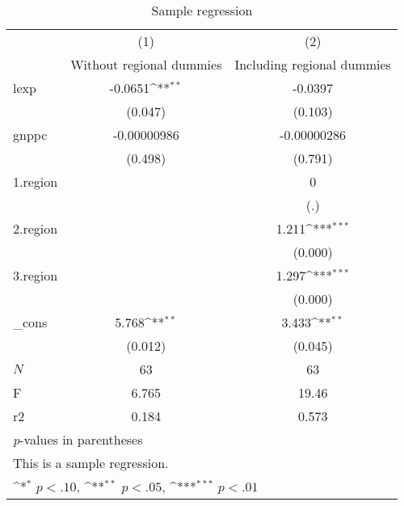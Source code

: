 \begin{table}[htbp]\centering
\def\sym#1{\ifmmode^{#1}\else\(^{#1}\)\fi}
\caption{Sample regression}
\begin{tabular}{l*{2}{c}}
\hline\hline
            &\multicolumn{1}{c}{(1)}&\multicolumn{1}{c}{(2)}\\
            &\multicolumn{1}{c}{Without regional dummies}&\multicolumn{1}{c}{Including regional dummies}\\
\hline
lexp        &     -0.0651\sym{**} &     -0.0397         \\
            &     (0.047)         &     (0.103)         \\
[1em]
gnppc       & -0.00000986         & -0.00000286         \\
            &     (0.498)         &     (0.791)         \\
[1em]
1.region    &                     &           0         \\
            &                     &         (.)         \\
[1em]
2.region    &                     &       1.211\sym{***}\\
            &                     &     (0.000)         \\
[1em]
3.region    &                     &       1.297\sym{***}\\
            &                     &     (0.000)         \\
[1em]
\_cons      &       5.768\sym{**} &       3.433\sym{**} \\
            &     (0.012)         &     (0.045)         \\
\hline
\(N\)       &          63         &          63         \\
F           &       6.765         &       19.46         \\
r2          &       0.184         &       0.573         \\
\hline\hline
\multicolumn{3}{l}{\footnotesize \textit{p}-values in parentheses}\\
\multicolumn{3}{l}{\footnotesize This is a sample regression.}\\
\multicolumn{3}{l}{\footnotesize \sym{*} \(p<.10\), \sym{**} \(p<.05\), \sym{***} \(p<.01\)}\\
\end{tabular}
\end{table}
